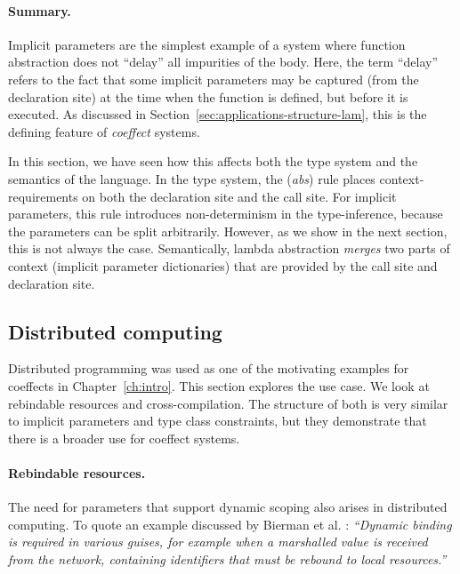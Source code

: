 \paragraph{Summary.}
Implicit parameters are the simplest example of a system where function abstraction does not 
``delay'' all impurities of the body. Here, the term ``delay'' refers to the fact that some 
implicit parameters may be captured (from the declaration site) at the time when the function is 
defined, but before it is executed. As discussed in Section~\ref{sec:applications-structure-lam},
this is the defining feature of \emph{coeffect} systems. 

In this section, we have seen how this affects both the type system and the semantics of the 
language. In the type system, the (\emph{abs}) rule places context-requirements on both the 
declaration site and the call site. For implicit parameters, this rule introduces non-determinism
in the type-inference, because the parameters can be split arbitrarily. However, as we show in the 
next section, this is not always the case. Semantically, lambda abstraction \emph{merges} two 
parts of context (implicit parameter dictionaries) that are provided by the call site and 
declaration site. 


\subsection{Distributed computing}
\label{sec:applications-flat-distr}

Distributed programming was used as one of the motivating examples for coeffects in 
Chapter~\ref{ch:intro}. This section explores the use case. We look at rebindable resources and
cross-compilation. The structure of both is very similar to implicit parameters and type
class constraints, but they demonstrate that there is a broader use for coeffect systems.


\paragraph{Rebindable resources.}

The need for parameters that support dynamic scoping also arises in distributed computing.
To quote an example discussed by Bierman et al. \cite{app-distributed-rebinding}: \emph{``Dynamic 
binding is required in various guises, for example when a marshalled value is received from the 
network, containing identifiers that must be rebound to local resources.''} 

